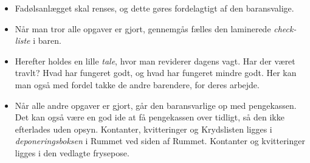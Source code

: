 \begin{itemize}
    \item Fadølsanlægget skal renses, og dette gøres fordelagtigt af den baransvalige.
    \item Når man tror alle opgaver er gjort, gennemgås fælles den laminerede \textit{check-liste} i baren.
    \item Herefter holdes en lille \textit{tale}, hvor man reviderer dagens vagt. Har der været travlt? 
    Hvad har fungeret godt, og hvad har fungeret mindre godt.
    Her kan man også med fordel takke de andre barendere, for deres arbejde.
    \item Når alle andre opgaver er gjort, går den baransvarlige op med pengekassen. 
    Det kan også være en god ide at få pengekassen over tidligt, så den ikke efterlades uden opsyn.
    Kontanter, kvitteringer og Krydslisten ligges i \textit{deponeringsboksen} i Rummet ved
    siden af Rummet. Kontanter og kvitteringer ligges i den vedlagte frysepose.
\end{itemize}

\printindex


